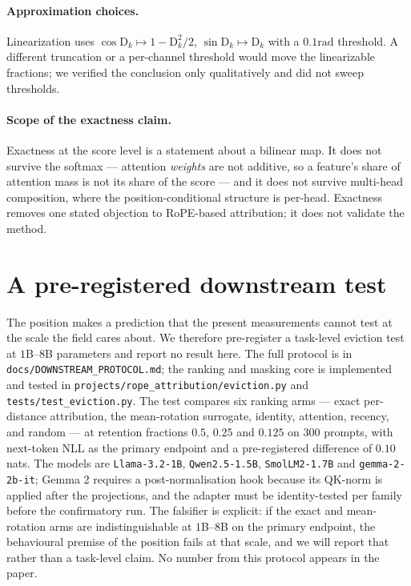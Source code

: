 \documentclass{article}
\theoremstyle{plain}
\theoremstyle{remark}
\newcommand{\D}{\mathrm{D}_k}
\newcommand{\rad}{\mathrm{rad}}
\begin{document}
\paragraph{Approximation choices.} Linearization uses $\cos\D \mapsto 1 -
\D^2/2$, $\sin\D \mapsto\D$ with a $0.1\rad$ threshold. A different truncation
or a per-channel threshold would move the linearizable fractions; we verified
the conclusion only qualitatively and did not sweep thresholds.

\paragraph{Scope of the exactness claim.} Exactness at the score level is a
statement about a bilinear map. It does not survive the softmax --- attention
\emph{weights} are not additive, so a feature's share of attention mass is not
its share of the score --- and it does not survive multi-head composition,
where the position-conditional structure is per-head. Exactness removes one
stated objection to RoPE-based attribution; it does not validate the method.

\section{A pre-registered downstream test}
\label{app:downstream-protocol}

The position makes a prediction that the present measurements cannot test at
the scale the field cares about. We therefore pre-register a task-level
eviction test at $1$B--$8$B parameters and report no result here. The full
protocol is in \texttt{docs/DOWNSTREAM\_PROTOCOL.md}; the ranking and masking
core is implemented and tested in
\texttt{projects/rope\_attribution/eviction.py} and
\texttt{tests/test\_eviction.py}. The test compares six ranking arms --- exact
per-distance attribution, the mean-rotation surrogate, identity, attention,
recency, and random --- at retention fractions $0.5$, $0.25$ and $0.125$ on
$300$ prompts, with next-token NLL as the primary endpoint and a
pre-registered difference of $0.10$ nats. The models are
\texttt{Llama-3.2-1B}, \texttt{Qwen2.5-1.5B}, \texttt{SmolLM2-1.7B} and
\texttt{gemma-2-2b-it}; Gemma 2 requires a post-normalisation hook because its
QK-norm is applied after the projections, and the adapter must be identity-tested
per family before the confirmatory run. The falsifier is explicit: if the exact
and mean-rotation arms are indistinguishable at $1$B--$8$B on the primary
endpoint, the behavioural premise of the position fails at that scale, and we
will report that rather than a task-level claim. No number from this protocol
appears in the paper.



\end{document}
